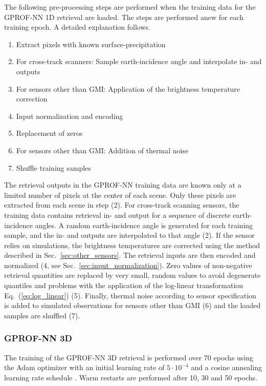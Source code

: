 \documentclass[journal abbreviation, manuscript]{copernicus}
\begin{document}
The following pre-processing steps are performed when the training data for the
GPROF-NN 1D retrieval are loaded. The steps are performed anew for each training
epoch. A detailed explanation follows.

\begin{enumerate}
  \item Extract pixels with known surface-precipitation
  \item For cross-track scanners: Sample earth-incidence angle and interpolate in- and outputs
  \item For sensors other than GMI: Application of the brightness temperature correction
  \item Input normalization and encoding
  \item Replacement of zeros
  \item For sensors other than GMI: Addition of thermal noise
  \item Shuffle training samples
\end{enumerate}

 The retrieval outputs in the GPROF-NN training data are known only at a limited
 number of pixels at the center of each scene. Only these pixels are extracted
 from each scene in step (2). For cross-track scanning sensors, the training data
 contains retrieval in- and output for a sequence of discrete earth-incidence
 angles. A random earth-incidence angle is generated for each training sample,
 and the in- and outputs are interpolated to that angle (2). If the sensor
 relies on simulations, the brightness temperatures are corrected using the
 method described in Sec.~\ref{sec:other_sensors}. The retrieval inputs are then
 encoded and normalized (4, see Sec.~\ref{sec:input_normalization}). Zero values
 of non-negative retrieval quantities are replaced by very small, random values
 to avoid degenerate quantiles and problems with the application of the
 log-linear transformation Eq.~(\ref{eq:log_linear}) (5). Finally, thermal noise
 according to sensor specification is added to simulated observations for
 sensors other than GMI (6) and the loaded samples are shuffled (7).


\subsubsection{GPROF-NN 3D}

 The training of the GPROF-NN 3D retrieval is performed over 70 epochs using the
 Adam optimizer \citep{kingma14} with an initial learning rate of
 $5\cdot10^{-4}$ and a cosine annealing learning rate schedule
 \citep{loshchilov16}. Warm restarts are performed after 10, 30 and 50 epochs.
\end{document}
